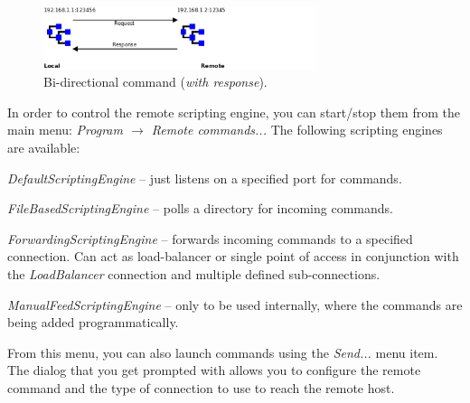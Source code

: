 \begin{figure}[htb]
  \centering
  \includegraphics[width=8.0cm]{images/remote_command-bi_directional.png}
  \caption{Bi-directional command (\textit{with response}).}
  \label{remote_command-bi_directional}
\end{figure}

In order to control the remote scripting engine, you can start/stop them
from the main menu: \textit{Program $\rightarrow$ Remote commands...}
The following scripting engines are available:
\begin{tight_itemize}
  \item \textit{DefaultScriptingEngine} -- just listens on a specified
  port for commands.
  \item \textit{FileBasedScriptingEngine} -- polls a directory for incoming
  commands.
  \item \textit{ForwardingScriptingEngine} -- forwards incoming commands
  to a specified connection. Can act as load-balancer or single point of access
  in conjunction with the \textit{LoadBalancer} connection and multiple defined
  sub-connections.
  \item \textit{ManualFeedScriptingEngine} -- only to be used internally, where
  the commands are being added programmatically.
\end{tight_itemize}

From this menu, you can also launch commands using the \textit{Send...}
menu item. The dialog that you get prompted with allows you to configure
the remote command and the type of connection to use to reach the remote
host.

